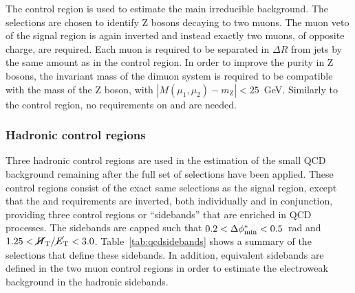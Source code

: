 The \mmj control region is used to estimate the main irreducible \znnj 
background. The selections are chosen to identify Z bosons decaying to two 
muons. The muon veto of the signal region is again inverted and instead exactly 
two muons, of opposite charge, are required. Each muon is required to be 
separated in $\Delta R$ from jets by the same amount as in the \mj control 
region. In order to improve the purity in Z bosons, the invariant mass of the 
dimuon system is required to be compatible with the mass of the Z boson, with 
$|M(\mu_1,\mu_2) - m_\mathrm{Z}| < 25$~GeV. Similarly to the \mj control 
region, no requirements on \alphat and \bdphi are needed.



\subsubsection{Hadronic control regions}
\label{sec:analysis-eventselection-qcdsidebands}
Three hadronic control regions are used in the estimation of the small QCD 
background remaining after the full set of selections have been applied. These 
control regions consist of the exact same selections as the signal region, 
except that the \bdphi and \mhtmet requirements are inverted, both individually 
and in conjunction, providing three control regions or ``sidebands'' that are 
enriched in QCD processes. The sidebands are capped such that 
$0.2<\mbox{$\Delta\phi^{*}_{\mathrm{min}}$}<0.5$~rad and $1.25<\mbox{$\mbox{$\cancel{H}_\text{T}$} / \mbox{$\cancel{E}_\text{T}$}$}<3.0$. 
Table~\ref{tab:qcdsidebands} shows a summary of the selections that define 
these sidebands. In addition, equivalent sidebands are defined in the two muon 
control regions in order to estimate the electroweak background in the hadronic 
sidebands.

